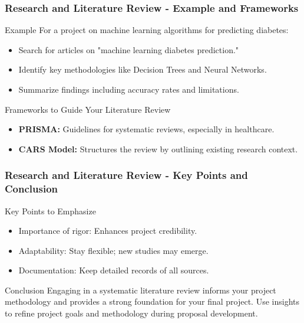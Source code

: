 \documentclass[aspectratio=169]{beamer}
\begin{document}
\begin{frame}[fragile]
    \frametitle{Research and Literature Review - Example and Frameworks}
    \begin{block}{Example}
        For a project on machine learning algorithms for predicting diabetes:
        \begin{itemize}
            \item Search for articles on "machine learning diabetes prediction."
            \item Identify key methodologies like Decision Trees and Neural Networks.
            \item Summarize findings including accuracy rates and limitations.
        \end{itemize}
    \end{block}

    \begin{block}{Frameworks to Guide Your Literature Review}
        \begin{itemize}
            \item \textbf{PRISMA:} Guidelines for systematic reviews, especially in healthcare.
            \item \textbf{CARS Model:} Structures the review by outlining existing research context.
        \end{itemize}
    \end{block}
\end{frame}

\begin{frame}[fragile]
    \frametitle{Research and Literature Review - Key Points and Conclusion}
    \begin{block}{Key Points to Emphasize}
        \begin{itemize}
            \item Importance of rigor: Enhances project credibility.
            \item Adaptability: Stay flexible; new studies may emerge.
            \item Documentation: Keep detailed records of all sources.
        \end{itemize}
    \end{block}

    \begin{block}{Conclusion}
        Engaging in a systematic literature review informs your project methodology and provides a strong foundation for your final project. Use insights to refine project goals and methodology during proposal development.
    \end{block}
\end{frame}
\end{document}
